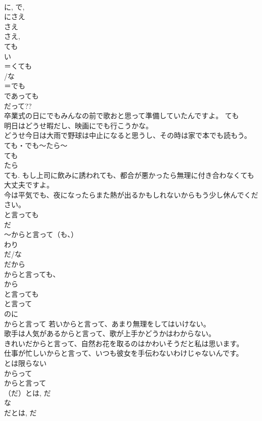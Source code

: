 \documentclass[8pt]{extreport}
\begin{document}
\begin{CJK}{UTF8}{min}
\\	に, で, 
\\	にさえ 
\\	さえ 
\\	さえ, 
\\	ても 
\\	い
\\	＝くても 
\\	/な
\\	＝でも 
\\	であっても 
\\	だって?? 
\\	卒業式の日にでもみんなの前で歌おと思って準備していたんですよ。 ても 
\\	明日はどうせ暇だし、映画にでも行こうかな。 
\\	どうせ今日は大雨で野球は中止になると思うし、その時は家で本でも読もう。 
\\	ても・でも～たら～ 
\\	ても 
\\	たら 
\\	ても. もし上司に飲みに誘われても、都合が悪かったら無理に付き合わなくても大丈夫ですよ。 
\\	今は平気でも、夜になったらまた熱が出るかもしれないからもう少し休んでください。 
\\	と言っても
\\	だ 
\\	～からと言って（も、） 
\\	わり 
\\	だ/な
\\	だから 
\\	からと言っても、　
\\	から
\\	と言っても
\\	と言って 
\\	のに 
\\	からと言って 若いからと言って、あまり無理をしてはいけない。 
\\	歌手は人気があるからと言って、歌が上手かどうかはわからない。 
\\	きれいだからと言って、自然お花を取るのはかわいそうだと私は思います。 
\\	仕事が忙しいからと言って、いつも彼女を手伝わないわけじゃないんです。 
\\	とは限らない 
\\	からって 
\\	からと言って 
\\	（だ）とは, だ 
\\	な
\\	だとは, だ 

\end{CJK}
\end{document}
